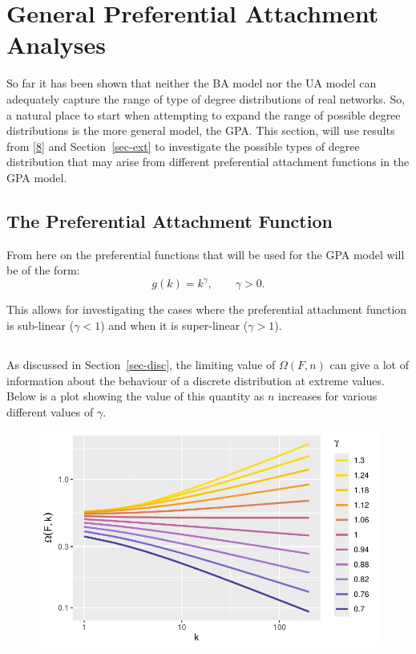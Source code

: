 \documentclass[
  10pt,
  a4paper,
]{scrreprt}
\theoremstyle{definition}
\theoremstyle{plain}
\theoremstyle{plain}
\theoremstyle{remark}
\begin{document}
{\hypertarget{general-preferential-attachment-analyses}{%
\section{General Preferential Attachment
Analyses}\label{general-preferential-attachment-analyses}}

So far it has been shown that neither the BA model nor the UA model can
adequately capture the range of type of degree distributions of real
networks. So, a natural place to start when attempting to expand the
range of possible degree distributions is the more general model, the
GPA. This section, will use results from
{[}\protect\hyperlink{ref-shimura12}{8}{]} and Section~\ref{sec-ext} to
investigate the possible types of degree distribution that may arise
from different preferential attachment functions in the GPA model.

\hypertarget{the-preferential-attachment-function}{%
\subsection{The Preferential Attachment
Function}\label{the-preferential-attachment-function}}

From here on the preferential functions that will be used for the GPA
model will be of the form: \[
g(k) = k^\gamma, \qquad \gamma>0.
\]

This allows for investigating the cases where the preferential
attachment function is sub-linear (\(\gamma<1\)) and when it is
super-linear (\(\gamma>1\)).

\hypertarget{section}{%
\subsection{}\label{section}}

As discussed in Section~\ref{sec-disc}, the limiting value of
\(\Omega(F,n)\) can give a lot of information about the behaviour of a
discrete distribution at extreme values. Below is a plot showing the
value of this quantity as \(n\) increases for various different values
of \(\gamma\).

\begin{figure}[H]

{\centering \includegraphics{doc_files/figure-pdf/fig-omega-1.pdf}

}
\end{figure}}
\end{document}
